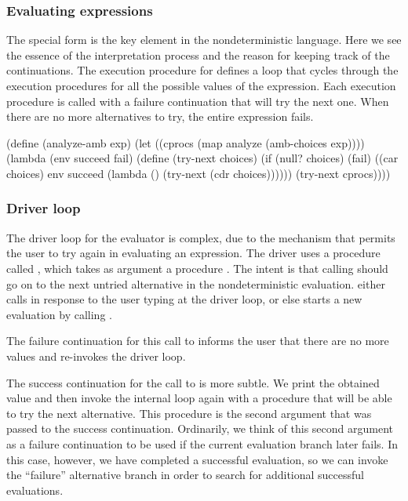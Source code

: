 \subsubsection*{Evaluating  expressions}

The  special form is the key element in the nondeterministic
language.  Here we see the essence of the interpretation process and the reason
for keeping track of the continuations.  The execution procedure for 
defines a loop  that cycles through the execution procedures for
all the possible values of the  expression.  Each execution procedure
is called with a failure continuation that will try the next one.  When there
are no more alternatives to try, the entire  expression fails.

\begin{codeBlock}
(define (analyze-amb exp)
  (let ((cprocs (map analyze (amb-choices exp))))
    (lambda (env succeed fail)
      (define (try-next choices)
        (if (null? choices)
            (fail)
            ((car choices)
             env
             succeed
             (lambda () (try-next (cdr choices))))))
      (try-next cprocs))))
\end{codeBlock}

\subsubsection*{Driver loop}

The driver loop for the  evaluator is complex, due to the mechanism
that permits the user to try again in evaluating an expression.  The driver
uses a procedure called , which takes as argument a
procedure .  The intent is that calling  should
go on to the next untried alternative in the nondeterministic evaluation.
 either calls  in response to the user
typing  at the driver loop, or else starts a new evaluation by
calling .

The failure continuation for this call to  informs the user that
there are no more values and re-invokes the driver loop.

The success continuation for the call to  is more subtle.  We
print the obtained value and then invoke the internal loop again with a
 procedure that will be able to try the next alternative.  This
 procedure is the second argument that was passed to the
success continuation.  Ordinarily, we think of this second argument as a
failure continuation to be used if the current evaluation branch later fails.
In this case, however, we have completed a successful evaluation, so we can
invoke the ``failure'' alternative branch in order to search for additional
successful evaluations.

